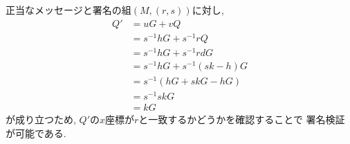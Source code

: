 \vspace{1em}
\indent 正当なメッセージと署名の組$(M, (r, s))$に対し, 
\begin{align*}
  Q'  &= uG + vQ\\
      &= s^{-1}hG + s^{-1}rQ \\
      &= s^{-1}hG + s^{-1}rdG \\
      &= s^{-1}hG + s^{-1}(sk-h)G \\
      &= s^{-1}(hG + skG - hG) \\
      &= s^{-1}skG \\
      &= kG
\end{align*}
が成り立つため, $Q'$の$x$座標が$r$と一致するかどうかを確認することで
署名検証が可能である.\\